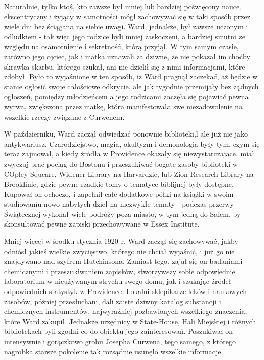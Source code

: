 Naturalnie, tylko ktoś, kto zawsze był mniej lub bardziej poświęcony nauce, ekscentryczny i żyjący w samotności mógł zachowywać się w taki sposób przez wiele dni bez ściągana na siebie uwagi. Ward, jednakże, był zawsze uczonym i odludkiem - tak więc jego rodzice byli mniej zaskoczeni, a bardziej smutni ze względu na osamotnienie i sekretność, którą przyjął. W tym samym czasie, zarówno jego ojciec, jak i matka uznawali za dziwne, że nie pokazał im choćby skrawka skarbu, którego szukał, ani nie dzielił się z nimi informacjami, które zdobył. Było to wyjaśnione w ten sposób, iż Ward pragnął zaczekać, aż będzie w stanie ogłosić swoje całościowe odkrycie, ale jak tygodnie przemijały bez żądnych ogłoszeń, pomiędzy młodzieńcem a jego rodzicami zaczęła się pojawiać pewna wyrwa, zwiększona przez matkę, która manifestowała swe niezadowolenie na wszelkie rzeczy związane z Curwenem.

W październiku, Ward zaczął odwiedzać ponownie biblioteki,l ale już nie jako antykwariusz. Czarodziejstwo, magia, okultyzm i demonologia były tym, czym się teraz zajmował, a kiedy źródła w Providence okazały się niewystarczające, miał zwyczaj brać pociąg do Bostonu i przeszukiwać bogate zasoby biblioteki w COpley Squeare, Widener Library na Harvardzie, lub Zion Research Library na Brooklinie, gdzie pewne rzadkie tomy o tematyce biblijnej były dostępne. Kupował on ochoczo, i zapełnił całe dodatkowe półki na książki w swoim studiowaniu nowo nabytych dzieł na niezwykłe tematy - podczas przerwy Świątecznej wykonał wiele podróży poza miasto, w tym jedną do Salem, by skonsultować pewne zapiski przechowywane w Essex Institute.

Mniej-więcej w środku stycznia 1920 r. Ward zaczął się zachowywać, jakby odniósł jakieś wielkie zwycięstwo, którego nie chciał wyjaśnić, i już go nie znajdywano nad szyfrem Hutchinsona. Zamiast tego, zajął się on badaniami chemicznymi i przeszukiwaniem zapisków, stworzywszy sobie odpowiednie laboratorium w nieużywanym strychu swego domu, jak i szukając źródeł odpowiednich statystyk w Providence. Lokalni sklepikarze leków i naukowych zasobów, później przesłuchani, dali zaiste dziwny katalog substancji i chemicznych instrumentów, najwyraźniej pozbawionych wszelkiego znaczenia, które Ward zakupił. Jednakże urzędnicy w State-House, Hali Miejskiej i różnych bibliotekach byli zgodni co do obiektu jego zainteresowań. Poszukiwał on intensywnie i gorączkowo grobu Josepha Curwena, tego samego, z którego nagrobka starsze pokolenie tak rozsądnie usunęło wszelkie informacje. 

